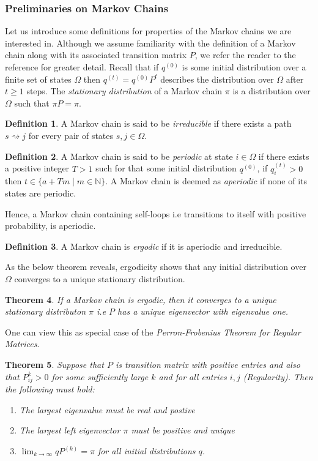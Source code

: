 \documentclass[12pt]{amsart}
\newtheorem{theorem}{Theorem}[section]
\theoremstyle{definition}
\newtheorem{definition}[theorem]{Definition}
\theoremstyle{remark}
\numberwithin{equation}{section}
\theoremstyle{remark}
\begin{document}
\subsubsection{Preliminaries on Markov Chains}
Let us introduce some definitions for properties of the Markov chains we are interested in. Although we assume familiarity with the definition of a Markov chain along with its associated transition matrix $P$, we refer the reader to the reference \cite{cover} for greater detail. Recall that if $q^{(0)}$ is some initial distribution over a finite set of states $\Omega$ then $q^{(t)} = q^{(0)}P^t$ describes the distribution over $\Omega$ after $t \geq 1$ steps. The \emph{stationary distribution} of a Markov chain $\pi$ is a distribution over $\Omega$ such that $\pi P = \pi$.
%
\begin{definition}
  A Markov chain is said to be \emph{irreducible} if there exists a path $s \rightsquigarrow j$ for every pair of states $s,j \in \Omega$.
\end{definition}
%
\begin{definition}
  A Markov chain is said to be \emph{periodic} at state $i \in \Omega$ if there exists a positive integer $T > 1$ such for that some initial distribution $q^(0)$, if $q_i^{(t)} > 0$ then $t \in \{a + Tm \mid m \in \mathbb{N}\}$. A Markov chain is deemed as \emph{aperiodic} if none of its states are periodic.
\end{definition}
\noindent Hence, a Markov chain containing self-loops i.e transitions to itself with positive probability, is aperiodic.
%
\begin{definition}
  A Markov chain is \emph{ergodic} if it is aperiodic and irreducible.
\end{definition}
\noindent As the below theorem reveals, ergodicity shows that any initial distribution over $\Omega$ converges to a unique stationary distribution.
%
\begin{theorem}
  If a Markov chain is ergodic, then it converges to a unique stationary distributon $\pi$ i.e $P$ has a unique eigenvector with eigenvalue one.
\end{theorem}
%
\noindent One can view this as special case of the \emph{Perron-Frobenius Theorem for Regular Matrices}.
%
\begin{theorem} \label{perron}
  Suppose that $P$ is transition matrix with positive entries and also that $P_{ij}^{k} > 0$ for some sufficiently large $k$ and for all entries $i,j$ (Regularity). Then the following must hold:
  \begin{enumerate}
    \item The largest eigenvalue must be real and postive
    \item The largest left eigenvector $\pi$ must be positive and unique
    \item $\lim_{k \rightarrow \infty} qP^{(k)} = \pi$ for all initial distributions $q$.
  \end{enumerate}
\end{theorem}
\end{document}
